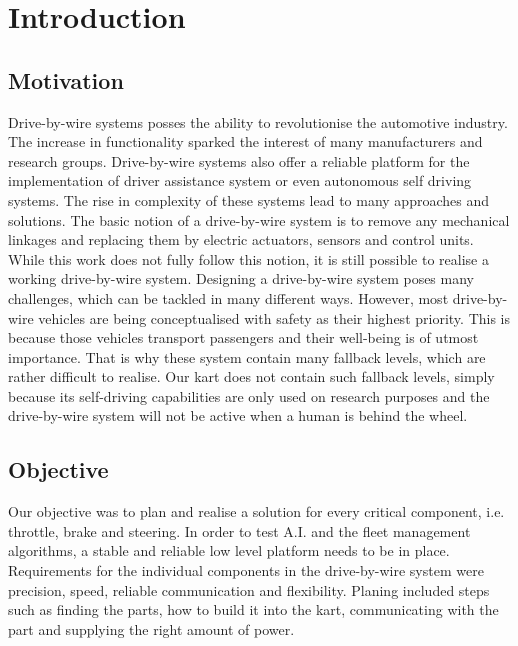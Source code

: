 
\chapter{Introduction}
\label{chp:Introduction}


\section{Motivation}

Drive-by-wire systems posses the ability to revolutionise the automotive industry. The increase in functionality sparked the interest of many manufacturers and research groups. Drive-by-wire systems also offer a reliable platform for the implementation of driver assistance system or even autonomous self driving systems. The rise in complexity of these systems lead to many approaches and solutions. The basic notion of a drive-by-wire system is to remove any mechanical linkages and replacing them by electric actuators, sensors and control units. While this work does not fully follow this notion, it is still possible to realise a working drive-by-wire system.
Designing a drive-by-wire system poses many challenges, which can be tackled in many different ways. However, most drive-by-wire vehicles are being conceptualised with safety as their highest priority. This is because those vehicles transport passengers and their well-being is of utmost importance. That is why these system contain many fallback levels, which are rather difficult to realise. Our kart does not contain such fallback levels, simply because its self-driving capabilities are only used on research purposes and the drive-by-wire system will not be active when a human is behind the wheel. 


\section{Objective}
Our objective was to plan and realise a solution for every critical component, i.e. throttle, brake and steering. In order to test A.I. and the fleet management algorithms, a stable and reliable low level platform needs to be in place. Requirements for the individual components in the drive-by-wire system were precision, speed, reliable communication and flexibility. Planing included steps such as finding the parts, how to build it into the kart, communicating with the part and supplying the right amount of power.

